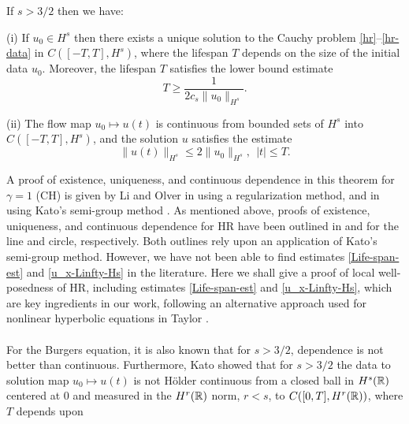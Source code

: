 %
%
%
%
%
%
\begin{theorem}
\label{thm:HR_existence_continuous_dependence}
If   $s>3/2$  then we have:

(i) If $u_0\in H^s$  then  there exists a unique solution to
the Cauchy problem  \eqref{hr}--\eqref{hr-data} in $C([-T, T], H^s)$, where 
the lifespan  $T$ depends on the size
of the initial data $u_0$. Moreover, 
the  lifespan $T$ satisfies the lower bound estimate 
%
%
%
\begin{equation}
\label{Life-span-est}
T
\ge
\frac{1}{2c_s \|u_0\|_{H^s}}.
\end{equation}
%

(ii)
The flow map $u_0 \mapsto u(t)$ is continuous from
bounded sets of $H^s$ into \\ $C([-T, T], H^s)$,
and the solution $u$ satisfies the estimate
%
%
%
\begin{equation}
\label{u_x-Linfty-Hs}
\|
u(t)
\|_ {H^s}
\le
2
\|
u_0
\|_{H^s}, \ \ |t|\le T.
\end{equation}
%
%
%
\end{theorem}
%
%
A proof of existence, uniqueness, and continuous dependence in this 
theorem for $\gamma =1$ (CH) 
is given  by Li and Olver in 
\cite{Li_2000_Well-posedness-} using a regularization method, and in
\cite{Rodriguez-Blanco_2001_On-the-Cauchy-p} using 
Kato's semi-group method \cite{Kato:1975}. As mentioned 
above, proofs of 
existence, uniqueness, and continuous dependence for  HR
have been outlined in \cite{Yin_2003_On-the-Cauchy-p} and 
\cite{Zhou_2005_Local-well-pose} for the line and circle, 
respectively. Both outlines rely upon an application of Kato's semi-group 
method. However, we have not been able to find estimates  
\eqref{Life-span-est} and \eqref{u_x-Linfty-Hs}  in the literature.
Here we shall give a proof of local well-posedness of HR,
including  estimates \eqref{Life-span-est} and \eqref{u_x-Linfty-Hs},
which are key ingredients in our work, 
following an alternative approach used for nonlinear hyperbolic equations
in Taylor \cite{Taylor:1991}.
\\
\\
For the Burgers equation, it is also known that for $s > 3/2$, dependence is not
better than continuous. Furthermore, Kato \cite{Kato:1975}
showed that for $s > 3/2$ the data to solution map $u_{0} \mapsto u(t)$ is not
H\"older continuous from a closed ball in $H^{s}(\mathbb{R})$ centered at $0$ and measured
in the $H^{r}(\mathbb{R})$ norm, $r < s$, to $C([0, T], H^{r}(\mathbb{R}))$, where $T$ depends upon

